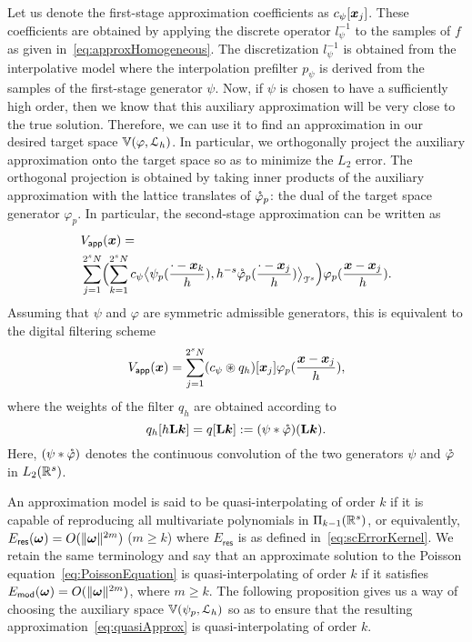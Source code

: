 Let us denote the first-stage approximation coefficients as
$c_{\psi}[\vect{x}_j]$. These coefficients are obtained by applying the discrete
operator $l_{\psi}^{-1}$ to the samples of $f$ as given
in~\eqref{eq:approxHomogeneous}. The discretization $l_{\psi}^{-1}$ is obtained
from the interpolative model where the interpolation prefilter $p_\psi$ is derived
from the samples of the first-stage generator $\psi$. Now, if $\psi$ is chosen
to have a sufficiently high order, then we know that this auxiliary
approximation will be very close to the true solution. Therefore, we can use it
to find an approximation in our desired target space
$\aspace{\lattice{L}_h}{\varphi}$. In particular, we orthogonally project the
auxiliary approximation onto the target space so as to minimize the $L_2$ error.
The orthogonal projection is obtained by taking inner products of the auxiliary
approximation with the lattice translates of $\dual{\varphi}_p$: the dual of the
target space generator $\varphi_p$. In particular, the second-stage
approximation can be written as
\begin{equation}
  \begin{split}
  & \appf{V}(\vect{x}) = \\
  & \sum_{j =1}^{2^s N} 
  \Bigl(
    \sum_{k = 1}^{2^s N}
    c_\psi \innerproduct{\psi_p(\frac{\cdot - \vect{x}_k}{h})}
    {h^{-s}\dual{\varphi}_p(\frac{\cdot - \vect{x}_j}{h})}
  \Bigr)
  \varphi_p(\frac{\vect{x}-\vect{x}_j}{h}).
\end{split}
\end{equation}
Assuming that $\psi$ and $\varphi$ are symmetric admissible
generators, this is equivalent to the digital filtering scheme
\begin{equation}
  \appf{V}(\vect{x}) = \sum_{j=1}^{2^s N} (c_\psi \pconv q_h)[\vect{x}_j]
  \varphi_p(\frac{\vect{x}-\vect{x}_j}{h}),
  \label{eq:quasiApprox}
\end{equation}
where the weights of the filter $q_h$ are obtained according to
\begin{equation}
  q_h[h\mat{L}\vect{k}] =  q[\mat{L}\vect{k}] := (\psi \ast
  \dual{\varphi})(\mat{L}\vect{k}).
  \label{eq:quasiWeights}
\end{equation}
Here, $(\psi \ast \dual{\varphi})$ denotes the continuous convolution
of the two generators $\psi$ and $\dual{\varphi}$ in $L_2(\reel^s)$.

An approximation model is said to be
quasi-interpolating of order $k$ if it is capable of reproducing all
multivariate polynomials in $\Pi_{k-1}(\reel^s)$, or  equivalently,
$E_{\mathsf{res}}(\vect{\omega}) = O(\norm{\vect{\omega}}^{2m})$  ($m \ge k$)
where $E_{\mathsf{res}}$ is as defined in~\eqref{eq:scErrorKernel}. We retain
the same terminology and say that an approximate solution to the Poisson
equation~\eqref{eq:PoissonEquation} is quasi-interpolating of order $k$ if it
satisfies $E_{\mathsf{mod}}(\vect{\omega}) = O(\norm{\vect{\omega}}^{2m})$,
where $m \ge k$. The following proposition gives us a way of choosing the
auxiliary space $\aspace{\lattice{L}_h}{\psi_p}$ so as to ensure that the
resulting approximation~\eqref{eq:quasiApprox} is quasi-interpolating of order
$k$.

